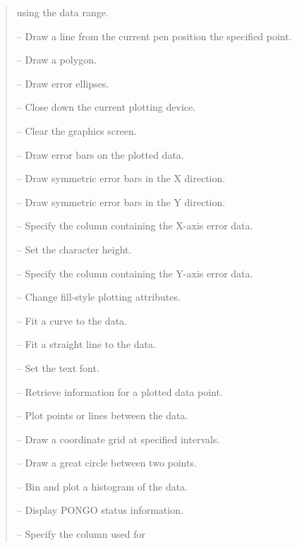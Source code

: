 \begin {quote}
\begin {description}
                                             using the data range.
\item [\iref{DRAW}] -- Draw a line from the current pen position the specified
                       point.
\item [\iref{DRAWPOLY}] -- Draw a polygon.
\item [\iref{ELLIPSES}] -- Draw error ellipses.
\item [\iiref{ENDP(LOT)}{ENDPLOT}] -- Close down the current plotting device.
\item [\iref{ERASE}] -- Clear the graphics screen.
\item [\iref{ERRORBAR}] -- Draw error bars on the plotted data.
\item [\iref{ERRX}] -- Draw symmetric error bars in the X direction.
\item [\iref{ERRY}] -- Draw symmetric error bars in the Y direction.
\item [\iiref{EXC(OLUMN)}{EXCOLUMN}] -- Specify the column containing
                                        the X-axis error data.
\item [\iiref{EXPA(ND)}{EXPAND}] -- Set the character height.
\item [\iiref{EYC(OLUMN)}{EYCOLUMN}] -- Specify the column containing
                                        the Y-axis error data.
\item [\iref{FILLSTY}] -- Change fill-style plotting attributes.
\item [\iiref{FITC(URVE)}{FITCURVE}] -- Fit a curve to the data.
\item [\iiref{FITL(INE)}{FITLINE}] -- Fit a straight line to the data.
\item [\iref{FONT}] -- Set the text font.
\item [\iiref{GETP(OINT)}{GETPOINT}] -- Retrieve information for a
                                        plotted data point.
\item [\iref{GPOINTS}] -- Plot points or lines between the data.
\item [\iref{GRID}] -- Draw a coordinate grid at specified intervals.
\item [\iref{GT\_CIRCLE}] -- Draw a great circle between two points.
\item [\iiref{HIST(OGRAM)}{HISTOGRAM}] -- Bin and plot a histogram of
                                          the data.
\item [\iiref{INQ(UIRE)}{INQUIRE}] -- Display PONGO status information.
\item [\iiref{LABC(OLUMN)}{LABCOLUMN}] -- Specify the column used for

\end{description}
\end{quote}
